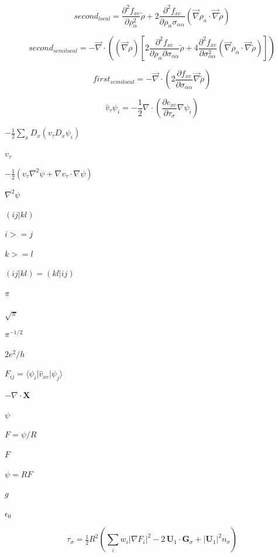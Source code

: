 \documentclass{article}
\begin{document}
\[       second_{local} = \frac{\partial^2 f_{xc}}{\partial \rho_\alpha^2}\tilde \rho
       + 2\frac{\partial^2 f_{xc}}{\partial \rho_\alpha\sigma_{\alpha\alpha}}
           \left(\vec\nabla \rho_a\cdot \vec \nabla\tilde\rho\right)
\]
\pagebreak

\[     second_{semilocal} = -\vec\nabla\cdot\left((\vec\nabla\rho)
            \left[2\frac{\partial^2 f_{xc}}{\partial\rho_\alpha\partial\sigma_{\alpha\alpha}}\tilde\rho
            + 4\frac{\partial^2 f_{xc}}{\partial\sigma_{\alpha\alpha}^2}
               \left(\vec\nabla\rho_\alpha\cdot\vec\nabla\tilde\rho\right)\right]\right)
\]
\pagebreak

\[     first_{semilocal} =
       -\vec\nabla\cdot\left(2\frac{\partial f_{xc}}{\partial\sigma_{\alpha\alpha}}\vec\nabla\tilde\rho\right)
\]
\pagebreak

\[  \hat v_\tau \psi_i = -\frac{1}{2}\nabla\cdot
       \left(\frac{\partial e_{xc}}{\partial\tau_\sigma}\nabla\psi_i\right)
\]
\pagebreak

$ -\frac{1}{2}\sum_x D_x(v_\tau D_x\psi_i) $
\pagebreak

$ v_\tau $
\pagebreak

$ -\frac{1}{2}(v_\tau\nabla^2\psi + \nabla v_\tau\cdot\nabla\psi) $
\pagebreak

$\nabla^2\psi$
\pagebreak

$(ij|kl)$
\pagebreak

$i>=j$
\pagebreak

$k>=l$
\pagebreak

$(ij|kl)=(kl|ij)$
\pagebreak

$\pi$
\pagebreak

$\sqrt{\pi}$
\pagebreak

$\pi^{-1/2}$
\pagebreak

$ 2e^2/h $
\pagebreak

$ F_{ij} = \langle\psi_i|\hat v_{xc}|\psi_j\rangle $
\pagebreak

$ -\nabla\cdot\mathbf X $
\pagebreak

$\psi$
\pagebreak

$ F=\psi/R $
\pagebreak

$ F $
\pagebreak

$ \psi = RF $
\pagebreak

$ g $
\pagebreak

$\epsilon_0$
\pagebreak

\[ \tau_\sigma = \tfrac12 R^2\left(\sum_i w_i|\nabla F_i|^2
       - 2\,\mathbf U_1\!\cdot\!\mathbf G_\sigma + |\mathbf U_1|^2 n_\sigma\right) \]
\pagebreak
\end{document}
